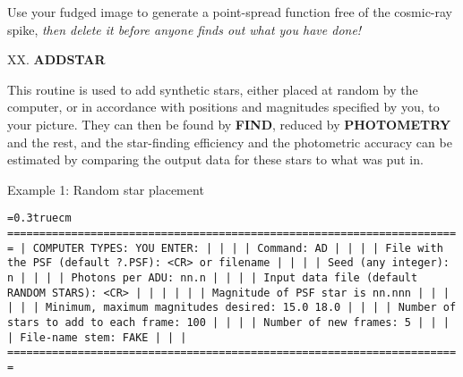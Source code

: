 Use your fudged image to generate a point-spread function free of the
cosmic-ray spike, {\it then delete it before anyone finds out what you
have done!}

\vfill
\eject
\noindent XX.  {\bf ADDSTAR}

This routine is used to add synthetic stars, either placed at
random by the computer, or in accordance with positions and magnitudes
specified by you, to your picture. They can then be found by {\bf
FIND}, reduced by {\bf PHOTOMETRY} and the rest, and the star-finding
efficiency and the photometric accuracy can be estimated by comparing
the output data for these stars to what was put in. 

\bigskip

\noindent Example 1:  Random star placement

\bigskip
{\noindent\obeylines\obeyspaces\frenchspacing\tt\baselineskip=0.3truecm
=======================================================================
| COMPUTER TYPES:                                  YOU ENTER:         |
|                                                                     |
| Command:                                         AD                 |
|                                                                     |
|         File with the PSF (default ?.PSF):       <CR> or filename   |
|                                                                     |
|                        Seed (any integer):       n                  |
|                                                                     |
|                           Photons per ADU:       nn.n               |
|                                                                     |
|    Input data file (default RANDOM STARS):       <CR>               |
|                                                                     |
|                                                                     |
|               Magnitude of PSF star is nn.nnn                       |
|                                                                     |
|                                                                     |
|       Minimum, maximum magnitudes desired:       15.0 18.0          |
|                                                                     |
|      Number of stars to add to each frame:       100                |
|                                                                     |
|                      Number of new frames:       5                  |
|                                                                     |
|                            File-name stem:       FAKE               |
|                                                                     |
=======================================================================
}
\bigskip

